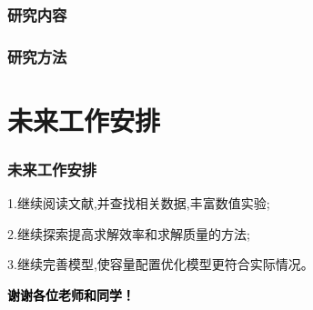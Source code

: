 \documentclass{beamer}
\begin{document}
\begin{frame}
	\frametitle{研究内容} 
	
\end{frame}

\begin{frame}
	\frametitle{研究方法} 

\end{frame}

\section{未来工作安排}
\begin{frame}
	\frametitle{未来工作安排} 
	1.继续阅读文献,并查找相关数据,丰富数值实验;

	2.继续探索提高求解效率和求解质量的方法;

	3.继续完善模型,使容量配置优化模型更符合实际情况。
\end{frame}



\begin{frame}
\vspace{1em}
\centering
\textcolor{black}{\LARGE\bf 谢谢各位老师和同学！}

\end{frame}
\end{document}

